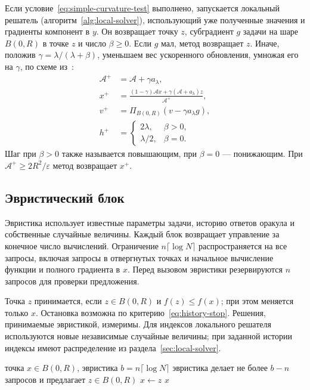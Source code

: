 Если условие~\eqref{eq:simple-curvature-test} выполнено, запускается
локальный решатель (алгоритм~\ref{alg:local-solver}), использующий уже
полученные значения и градиенты компонент в $y$. Он возвращает точку $z$, субградиент $g$
задачи на шаре $B(0,R)$ в точке $z$ и число $\beta\ge0$.
Если $g$ мал, метод возвращает $z$. Иначе, положив $\gamma=\lambda/(\lambda+\beta)$,
уменьшаем вес ускоренного обновления, умножая его на $\gamma$,
по схеме из~\citep{carmon2022adaptive}:
\begin{equation}\label{eq:damped-update}
 \begin{aligned}
 \mathcal A^+&=\mathcal A+\gamma a_\lambda,\\
 x^+&=\frac{(1-\gamma)\mathcal A x+
                 \gamma(\mathcal A+a_\lambda)z}{\mathcal A^+},\\
 v^+&=\Pi_{B(0,R)}(v-\gamma a_\lambda g),\\
 h^+&=\begin{cases}2\lambda,&\beta>0,\\\lambda/2,&\beta=0.\end{cases}
 \end{aligned}
\end{equation}
Шаг при $\beta>0$ также называется повышающим, при $\beta=0$ ---
понижающим. При $\mathcal A^+\ge2R^2/\varepsilon$ метод возвращает $x^+$.

\subsection{Эвристический блок}\label{sec:heuristic-block}

Эвристика использует известные параметры задачи, историю ответов
оракула и собственные случайные величины. Каждый блок возвращает
управление за конечное число вычислений. Ограничение $n\lceil\log N\rceil$
распространяется на все запросы, включая запросы в отвергнутых точках и начальное
вычисление функции и полного градиента в $x$. Перед вызовом эвристики
резервируются $n$ запросов для проверки предложения.

Точка $z$ принимается, если $z\in B(0,R)$ и $f(z)\le f(x)$;
при этом меняется только $x$. Остановка возможна по критерию~\eqref{eq:history-stop}.
Решения, принимаемые эвристикой, измеримы. Для индексов локального решателя используются
новые независимые случайные величины; при заданной истории индексы имеют
распределение из раздела~\ref{sec:local-solver}.

\begin{algorithm}[H]
\caption{\textsc{Блок}$(x)$: эвристический блок}\label{alg:block}
\begin{algorithmic}[1]
\Require точка $x\in B(0,R)$, эвристика
\State $b=n\lceil\log N\rceil$ 
\State {}
 \State эвристика делает не более $b-n$ запросов и предлагает $z\in B(0,R)$
 \State {}
  \State $x\gets z$
 \EndIf
\EndWhile
\State \Return $x$
\end{algorithmic}
\end{algorithm}


